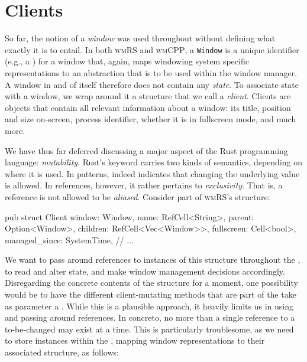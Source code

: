 \section{Clients}

So far, the notion of a \textit{window} was used throughout without defining
what exactly it is to entail. In both \textsc{wmRS} and \textsc{wmCPP}, a
\texttt{Window} is a unique identifier (e.g., a ) for a window that,
again, maps windowing system specific representations to an abstraction that is
to be used within the window manager. A window in and of itself therefore does
not contain any \textit{state}. To associate state with a window, we wrap around
it a structure that we call a \textit{client}. Clients are objects that contain
all relevant information about a window: its title, position and size on-screen,
process identifier, whether it is in fullscreen mode, and much more.


We have thus far deferred discussing a major aspect of the Rust programming
language: \textit{mutability}. Rust's  keyword carries two kinds
of semantics, depending on where it is used. In patterns,  indeed
indicates that changing the underlying value is allowed. In references, however,
it rather pertains to \textit{exclusivity}. That is, a  reference
is not allowed to be \textit{aliased}. Consider part of \textsc{wmRS}'s
 structure:

\begin{rustblock}
  pub struct Client {
    window: Window,
    name: RefCell<String>,
    parent: Option<Window>,
    children: RefCell<Vec<Window>>,
    fullscreen: Cell<bool>,
    managed_since: SystemTime,
    // ...
  }
\end{rustblock}

We want to pass around references to instances of this structure throughout
the , to read and alter state, and make window management
decisions accordingly. Disregarding the concrete contents of the 
structure for a moment, one possibility would be to have the different
client-mutating methods that are part of the  take as parameter
a . While this is a plausible approach, it heavily limits
us in using and passing around references. In concreto, no more than a single
reference to a to-be-changed  may exist at a time. This is
particularly troublesome, as we need to store  instances within the
, mapping window representations to their associated 
structure, as follows:

